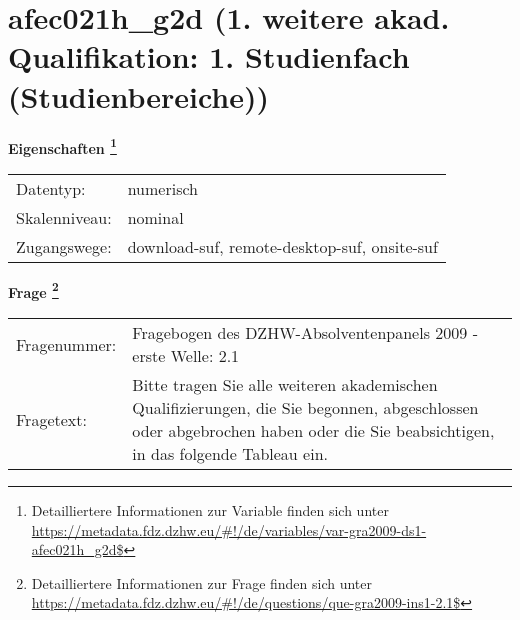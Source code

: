 
    \setcounter{footnote}{0}

    \vspace*{-1.8cm}
	\section{afec021h\_g2d (1. weitere akad. Qualifikation: 1. Studienfach (Studienbereiche))}
	\label{section:afec021h_g2d}



    \vspace*{0.5cm}
    \noindent\textbf{Eigenschaften
	\footnote{Detailliertere Informationen zur Variable finden sich unter
		\url{https://metadata.fdz.dzhw.eu/\#!/de/variables/var-gra2009-ds1-afec021h_g2d$}}}\\
	\begin{tabularx}{\hsize}{@{}lX}
	Datentyp: & numerisch \\
	Skalenniveau: & nominal \\
	Zugangswege: &
	  download-suf, 
	  remote-desktop-suf, 
	  onsite-suf
 \\
    \end{tabularx}



				\vspace*{0.5cm}
                \noindent\textbf{Frage
	                \footnote{Detailliertere Informationen zur Frage finden sich unter
		              \url{https://metadata.fdz.dzhw.eu/\#!/de/questions/que-gra2009-ins1-2.1$}}}\\
				\begin{tabularx}{\hsize}{@{}lX}
					Fragenummer: &
					  Fragebogen des DZHW-Absolventenpanels 2009 - erste Welle:
					  2.1
 \\
					Fragetext: & Bitte tragen Sie alle weiteren akademischen Qualifizierungen, die Sie begonnen, abgeschlossen oder abgebrochen haben oder die Sie beabsichtigen, in das folgende Tableau ein. \\
				\end{tabularx}





